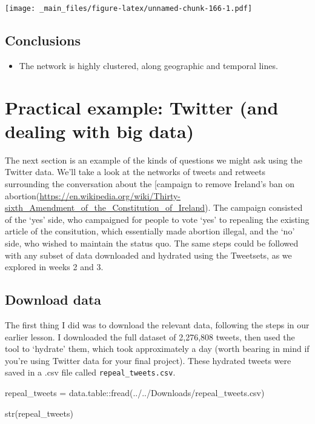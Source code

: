 \documentclass[
]{book}
\newenvironment{Shaded}{\begin{snugshade}}{\end{snugshade}}
\newcommand{\FunctionTok}[1]{\textcolor[rgb]{0.00,0.00,0.00}{#1}}
\newcommand{\NormalTok}[1]{#1}
\newcommand{\OtherTok}[1]{\textcolor[rgb]{0.56,0.35,0.01}{#1}}
\newcommand{\SpecialCharTok}[1]{\textcolor[rgb]{0.00,0.00,0.00}{#1}}
\newcommand{\StringTok}[1]{\textcolor[rgb]{0.31,0.60,0.02}{#1}}
\providecommand{\tightlist}{%
  \setlength{\itemsep}{0pt}\setlength{\parskip}{0pt}}
\begin{document}
\texttt{[image: \_main\_files/figure-latex/unnamed-chunk-166-1.pdf]}

\hypertarget{conclusions-2}{%
\subsection{Conclusions}\label{conclusions-2}}

\begin{itemize}
\tightlist
\item
  The network is highly clustered, along geographic and temporal lines.
\end{itemize}

\hypertarget{practical-example-twitter-and-dealing-with-big-data}{%
\section{Practical example: Twitter (and dealing with big data)}\label{practical-example-twitter-and-dealing-with-big-data}}

The next section is an example of the kinds of questions we might ask using the Twitter data. We'll take a look at the networks of tweets and retweets surrounding the conversation about the {[}campaign to remove Ireland's ban on abortion(\url{https://en.wikipedia.org/wiki/Thirty-sixth_Amendment_of_the_Constitution_of_Ireland}). The campaign consisted of the `yes' side, who campaigned for people to vote `yes' to repealing the existing article of the consitution, which essentially made abortion illegal, and the `no' side, who wished to maintain the status quo. The same steps could be followed with any subset of data downloaded and hydrated using the Tweetsets, as we explored in weeks 2 and 3.

\hypertarget{download-data}{%
\subsection{Download data}\label{download-data}}

The first thing I did was to download the relevant data, following the steps in our earlier lesson. I downloaded the full dataset of 2,276,808 tweets, then used the tool to `hydrate' them, which took approximately a day (worth bearing in mind if you're using Twitter data for your final project). These hydrated tweets were saved in a .csv file called \texttt{repeal\_tweets.csv}.

\begin{Shaded}
\begin{Highlighting}[]
\NormalTok{repeal\_tweets }\OtherTok{=}\NormalTok{ data.table}\SpecialCharTok{::}\FunctionTok{fread}\NormalTok{(}\StringTok{\textquotesingle{}../../Downloads/repeal\_tweets.csv\textquotesingle{}}\NormalTok{)}

\FunctionTok{str}\NormalTok{(repeal\_tweets)}
\end{Highlighting}
\end{Shaded}
\end{document}
